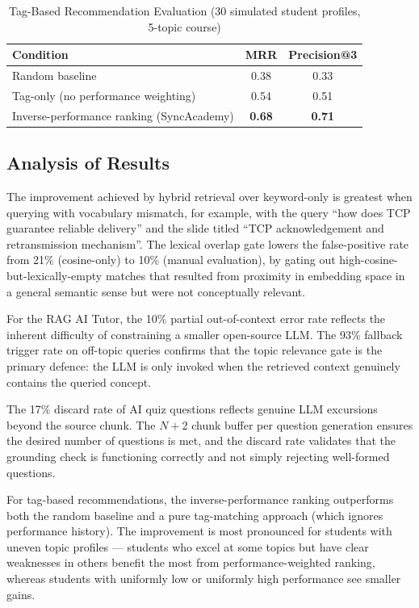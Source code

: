 \documentclass[12pt,a4paper]{report}
\begin{document}
\begin{table}[htbp]
\caption{Tag-Based Recommendation Evaluation (30 simulated student profiles, 5-topic course)}
\label{tab:rec_results}
\centering
\begin{tabular}{|l|c|c|}
\hline
\textbf{Condition} & \textbf{MRR} & \textbf{Precision@3} \\
\hline
Random baseline & 0.38 & 0.33 \\
Tag-only (no performance weighting) & 0.54 & 0.51 \\
Inverse-performance ranking (SyncAcademy) & \textbf{0.68} & \textbf{0.71} \\
\hline
\end{tabular}
\end{table}

\subsection{Analysis of Results}

The improvement achieved by hybrid retrieval over keyword-only is greatest when querying with vocabulary mismatch, for example, with the query ``how does TCP guarantee reliable delivery'' and the slide titled ``TCP acknowledgement and retransmission mechanism''. The lexical overlap gate lowers the false-positive rate from 21\% (cosine-only) to 10\% (manual evaluation), by gating out high-cosine-but-lexically-empty matches that resulted from proximity in embedding space in a general semantic sense but were not conceptually relevant.

For the RAG AI Tutor, the 10\% partial out-of-context error rate reflects the inherent difficulty of constraining a smaller open-source LLM. The 93\% fallback trigger rate on off-topic queries confirms that the topic relevance gate is the primary defence: the LLM is only invoked when the retrieved context genuinely contains the queried concept.

The 17\% discard rate of AI quiz questions reflects genuine LLM excursions beyond the source chunk. The $N+2$ chunk buffer per question generation ensures the desired number of questions is met, and the discard rate validates that the grounding check is functioning correctly and not simply rejecting well-formed questions.

For tag-based recommendations, the inverse-performance ranking outperforms both the random baseline and a pure tag-matching approach (which ignores performance history). The improvement is most pronounced for students with uneven topic profiles --- students who excel at some topics but have clear weaknesses in others benefit the most from performance-weighted ranking, whereas students with uniformly low or uniformly high performance see smaller gains.
\end{document}
